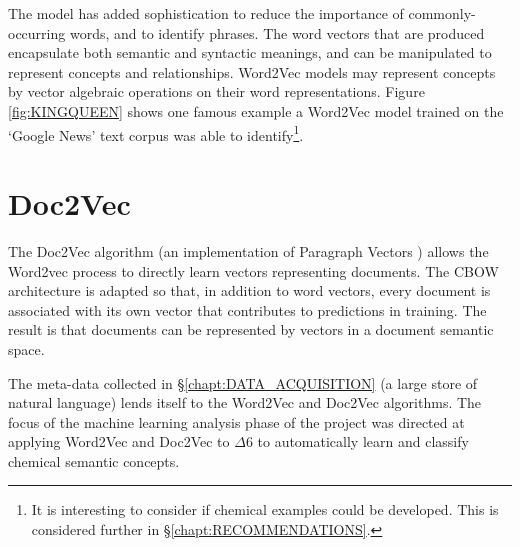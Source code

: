 The model has added sophistication to reduce the importance of commonly-occurring words, and to identify phrases. The word vectors that are produced encapsulate both semantic and syntactic meanings, and can be manipulated to represent concepts and relationships.
Word2Vec models may represent concepts by vector algebraic operations on their word representations. Figure \ref{fig:KINGQUEEN} shows one famous example a Word2Vec model trained on the `Google News' text corpus was able to identify\footnote{It is interesting to consider if chemical examples could be developed. This is considered further in \S\ref{chapt:RECOMMENDATIONS}.}.
\vspace{-0.3cm}
\section{Doc2Vec}
\vspace{-0.3cm}
The Doc2Vec algorithm \cite{gensim} (an implementation of Paragraph Vectors \cite{doc2vec}) allows the Word2vec process to directly learn vectors representing documents. The CBOW architecture is adapted so that, in addition to word vectors, every document is associated with its own vector that contributes to predictions in training. The result is that documents can be represented by vectors in a document semantic space.

The meta-data collected in \S\ref{chapt:DATA_ACQUISITION} (a large store of natural language) lends itself to the Word2Vec and Doc2Vec algorithms. The focus of the machine learning analysis phase of the project was directed at applying Word2Vec and Doc2Vec to $\Delta6$ to automatically learn and classify chemical semantic concepts.